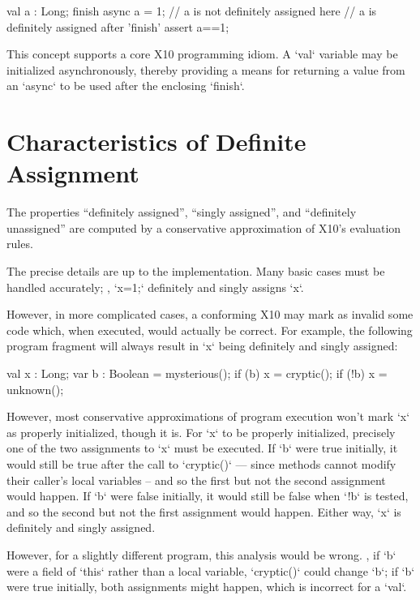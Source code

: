 \begin{ex}
\begin{xten}
val a : Long;
finish {
  async {
    a = 1;
  } 
  // a is not definitely assigned here
}
// a is definitely assigned after 'finish'
assert a==1; 
\end{xten}
\end{ex}

This concept supports a core X10 programming idiom.  A \xcd`val` variable may
be initialized asynchronously, thereby providing a means for returning a value
from an \xcd`async` to be used after the enclosing \xcd`finish`.  

\section{Characteristics of Definite Assignment}

The properties ``definitely assigned'', ``singly assigned'', and
``definitely unassigned'' are computed by a conservative approximation of
X10's evaluation rules.

The precise details are up to the implementation. 
Many basic cases must be handled accurately; \eg, \xcd`x=1;` definitely and
singly assigns \xcd`x`.  

However, in more complicated cases, a conforming X10 may mark as invalid 
some code which, when executed, would actually be correct.  
For example, the following
program fragment will always result in \xcd`x` being definitely and singly
assigned:  
\begin{xten}
val x : Long;
var b : Boolean = mysterious();
if (b) x = cryptic();
if (!b) x = unknown();
\end{xten}
However, most conservative approximations of program execution won't mark
\xcd`x` as properly initialized, though it is.   For \xcd`x` to be properly
initialized, precisely one of the 
two assignments to \xcd`x` must be executed. If \xcd`b` were true initially,
it would still be true after the call to \xcd`cryptic()` --- since methods
cannot modify their caller's local variables -- and so the first but not the
second assignment would happen. If \xcd`b` were false initially, it would
still be false when \xcd`!b` is tested, and so the second but not the first
assignment would happen.  Either way, \xcd`x` is definitely and singly assigned.

However, for a slightly different program, this analysis would be wrong. \Eg,
if  \xcd`b` were a field of \xcd`this` rather than a local variable,
\xcd`cryptic()` could change \xcd`b`; if \xcd`b` were true initially, both
assignments might happen, which is incorrect for a \xcd`val`.  

